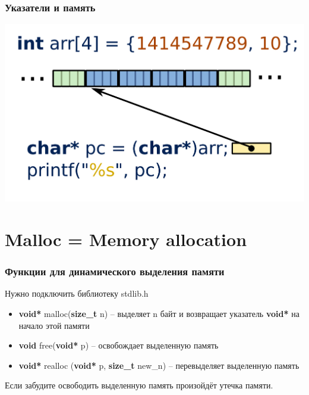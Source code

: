 \documentclass[12pt,pdf,hyperref={unicode}]{beamer}
\begin{document}
\begin{frame}[fragile]
\frametitle{Указатели и память} 
\begin{center}
\includegraphics[width=0.95\linewidth]{images/memory_different_pointers_4g.png}
\end{center}
\end{frame}







\section{Malloc = Memory allocation}

\begin{frame}[fragile]
\frametitle{Функции для динамического выделения памяти} 
Нужно подключить библиотеку stdlib.h
\begin{itemize}
\item \textbf{void*} malloc(\textbf{size\_t} n) -- выделяет n байт и возвращает указатель \textbf{void*}
на начало этой памяти \\
\item \textbf{void} free(\textbf{void*} p) -- освобождает выделенную память\\
\item \textbf{void*} realloc (\textbf{void*} p, \textbf{size\_t} new\_n) -- перевыделяет выделенную память\\
\end{itemize}
Если забудите освободить выделенную память произойдёт утечка памяти.
\end{frame}
\end{document}
